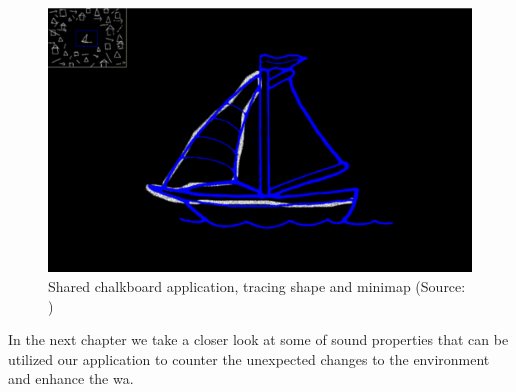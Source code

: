 \begin{figure}
	\centering
	\includegraphics[width=0.7\linewidth]{figures/gutwin_chalk_2011}
	\caption{Shared chalkboard application, tracing shape and minimap (Source: \cite{gutwin_chalk_2011})}
	\label{fig:gutwinchalk2011}
\end{figure}

In the next chapter we take a closer look at some of sound properties that can be utilized our application to counter the unexpected changes to the environment and enhance the \gls{wa}.

